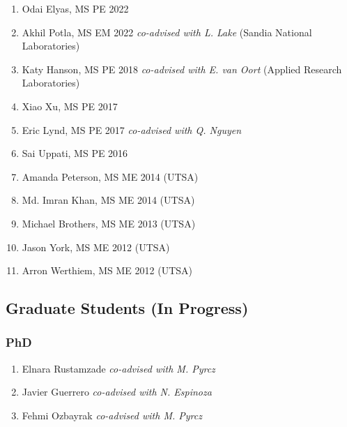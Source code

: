 \else
\begin{enumerate}
    \item Odai Elyas, MS PE 2022
    \item Akhil Potla, MS EM 2022 \emph{co-advised with L. Lake} (Sandia National Laboratories)
    \item Katy Hanson, MS PE 2018 \emph{co-advised with E. van Oort} (Applied Research Laboratories)
    \item Xiao Xu, MS PE 2017
    \item Eric Lynd, MS PE 2017  \emph{co-advised with Q. Nguyen}
    \item Sai Uppati, MS PE 2016
    \item Amanda Peterson, MS ME 2014 (UTSA)
    \item Md. Imran Khan, MS ME 2014 (UTSA)
    \item Michael Brothers, MS ME 2013 (UTSA)
    \item Jason York, MS ME 2012 (UTSA)
    \item Arron Werthiem, MS ME 2012 (UTSA)
\end{enumerate}
\fi

\subsection*{Graduate Students (In Progress)}



\subsubsection*{PhD}
\begin{enumerate}
    \item Elnara Rustamzade \emph{co-advised with M. Pyrcz}
    \item Javier Guerrero \emph{co-advised with N. Espinoza}
    \item Fehmi Ozbayrak \emph{co-advised with M. Pyrcz}
\end{enumerate}

